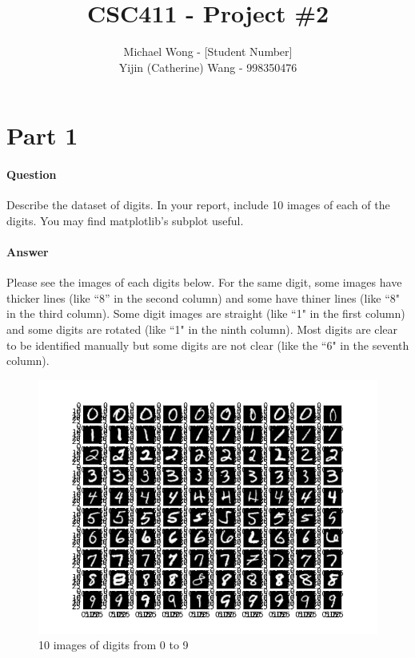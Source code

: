 \documentclass[11pt,twoside]{article}
\begin{document}
\title{CSC411 - Project \#2}
\author{Michael Wong - [Student Number]\\Yijin (Catherine) Wang - 998350476}
\maketitle

\clearpage

\section*{Part 1}
\paragraph{Question}
Describe the dataset of digits. In your report, include 10 images of each of the digits. You may find matplotlib’s subplot useful.

\paragraph{Answer}
Please see the images of each digits below. For the same digit, some images have thicker lines (like ``8'' in the second column) and some have thiner lines (like ``8" in the third column). Some digit images are straight (like ``1" in the first column) and some digits are rotated (like ``1" in the ninth column). Most digits are clear to be identified manually but some digits are not clear (like the ``6" in the seventh column). 

\begin{figure}[h]
	\centering
	\includegraphics[scale=0.8]{part1.png}
	\caption*{10 images of digits from 0 to 9}
\end{figure}
\end{document}
